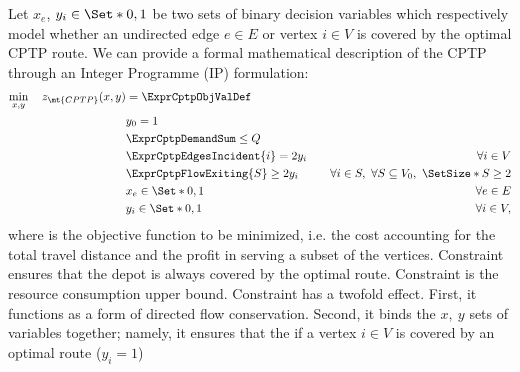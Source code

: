 Let $x_{e}$, $y_{i} \in \Set*{0, 1}$ be two sets of binary decision variables which respectively
model whether an undirected edge $e \in E$ or vertex $i \in V$ is covered by the optimal CPTP route.
We can provide a formal mathematical description of the CPTP through an Integer Programme (IP) formulation:
\begin{align}
	\min_{x,y} \quad z_\mt{CPTP}(x, y) & = \ExprCptpObjValDef                     & \label{eq:cptp-obj-function}                                                                          \\
	                                   & y_0 = 1                                  & \label{eq:cptp-depot-part-of-tour-constraint}                                                         \\
	                                   & \ExprCptpDemandSum  \le Q                & \label{eq:cptp-resource-upper-bound-constraint}                                                       \\
	                                   & \ExprCptpEdgesIncident{i}  = 2 y_i       & \quad \forall i \in V         \label{eq:cptp-flow-conservation-constraint}                            \\
	                                   & \ExprCptpFlowExiting{S} \ge 2 y_{i}      & \quad \forall i \in S,\ \forall S \subseteq V_0,\ \SetSize*{S} \ge 2 \label{eq:cptp-gsec-constraints} \\
	                                   & x_{e}                   \in \Set*{0, 1}  & \quad \forall e \in E               \label{eq:cptp-x-mip-var-bounds}                                  \\
	                                   & y_{i}                    \in \Set*{0, 1} & \quad \forall i \in V             \label{eq:cptp-y-mip-var-bounds},
\end{align}
where  is the objective function to be minimized, i.e. the cost
accounting for the total travel distance and the profit in serving a subset of the vertices.
Constraint  ensures that the depot is always covered by the optimal route.
Constraint  is the resource consumption upper bound.
Constraint  has a twofold effect.
First, it functions as a form of directed flow conservation.
Second, it binds the $x,\ y$ sets of variables together;
namely, it ensures that the if a vertex $i \in V$ is covered by an optimal route ($y_i = 1$)
